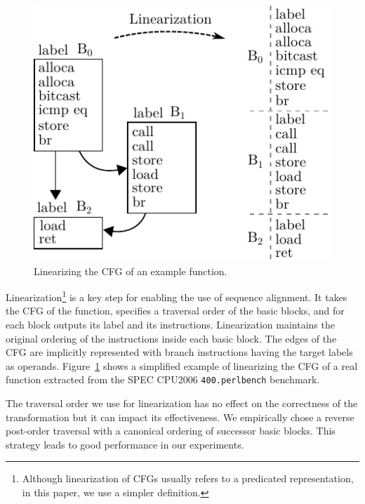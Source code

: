 \begin{figure}[t!]
  \centering
  \includegraphics[width=0.7\linewidth]{figs/linearization-example.pdf}
  \caption{Linearizing the CFG of an example function.}
  \label{fig:linearization-example}
\end{figure}

Linearization\footnote{Although linearization of CFGs
usually refers to a predicated representation, %
in this paper, we use a simpler definition.} is a key step for enabling the use of sequence alignment.
It takes the CFG of the function, specifies a traversal order of the basic blocks, and for each block outputs its label and its instructions.
Linearization maintains the original ordering of the instructions inside each basic block.
The edges of the CFG are implicitly represented with branch instructions having the target labels as operands.
Figure~\ref{fig:linearization-example} shows a simplified example of linearizing the CFG of a
real function extracted from the SPEC CPU2006 \texttt{400.perlbench} benchmark.



The traversal order we use for linearization has no effect on the correctness of the transformation
but it can impact its effectiveness. We empirically chose a reverse post-order traversal with a
canonical ordering of successor basic blocks.
This strategy leads to good performance in our experiments.

